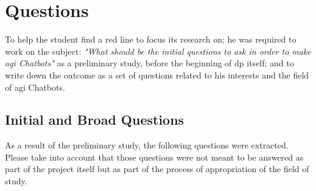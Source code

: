 \chapter{Questions}
\label{chap:questions}

To help the student find a red line to focus its research on; he was required to work on the subject: \textit{"What should be the initial questions to ask in order to make \gls{agi} Chatbots"} as a preliminary study, before the beginning of \gls{dp} itself; and to write down the outcome as a set of questions related to his interests and the field of \gls{agi} Chatbots.

\section{Initial and Broad Questions}
As a result of the preliminary study, the following questions were extracted. Please take into account that those questions were not meant to be answered as part of the project itself but as part of the process of appropriation of the field of study.

